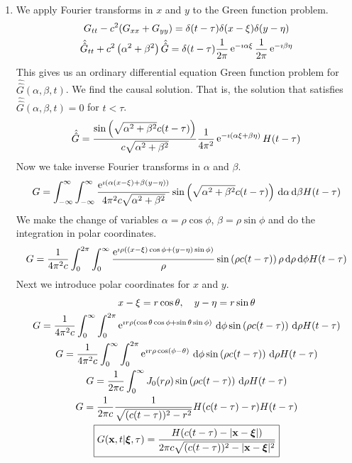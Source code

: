 {\begin{Solution}
  \begin{enumerate}
  \item
    We apply Fourier transforms in $x$ and $y$ to the Green function problem.
    \begin{gather*}
      G_{t t} - c^2 (G_{x x} + G_{y y}) = \delta(t - \tau) \delta(x - \xi) \delta(y - \eta)
      \\
      \hat{\hat{G}}_{t t} + c^2 \left( \alpha^2 + \beta^2 \right) \hat{\hat{G}} 
      = \delta(t - \tau) \frac{1}{2 \pi} \mathop{\mathrm{e}}\nolimits^{-\imath \alpha \xi} \frac{1}{2 \pi} \mathop{\mathrm{e}}\nolimits^{-\imath \beta \eta}
    \end{gather*}
    This gives us an ordinary differential equation Green function problem
    for $\hat{\hat{G}}(\alpha, \beta, t)$.        We find the causal solution.  That is, 
    the solution that satisfies $\hat{\hat{G}}(\alpha, \beta, t) = 0$ for $t < \tau$.
    \[
    \hat{\hat{G}} = \frac{ \sin \left( \sqrt{\alpha^2 + \beta^2} c (t - \tau) \right) }
    { c \sqrt{\alpha^2 + \beta^2} } \frac{1}{4 \pi^2} \mathop{\mathrm{e}}\nolimits^{-\imath (\alpha \xi + \beta \eta)} H(t - \tau)
    \]
    Now we take inverse Fourier transforms in $\alpha$ and $\beta$.
    \[
    G = \int_{-\infty}^\infty \int_{-\infty}^\infty \frac{ \mathop{\mathrm{e}}\nolimits^{\imath (\alpha (x - \xi) + \beta (y - \eta))}        }
    { 4 \pi^2 c \sqrt{\alpha^2 + \beta^2} } \sin \left( \sqrt{\alpha^2 + \beta^2} c (t - \tau) \right) 
    \,\mathrm{d} \alpha \,\mathrm{d} \beta H(t - \tau)
    \]
    We make the change of variables $\alpha = \rho \cos \phi$, $\beta = \rho \sin \phi$ and do the 
    integration in polar coordinates.
    \[
    G = \frac{1}{4 \pi^2 c} \int_0^{2 \pi} \int_0^\infty \frac{ \mathop{\mathrm{e}}\nolimits^{\imath \rho ((x - \xi) \cos \phi + (y - \eta) \sin \phi)}  }
    { \rho } \sin \left( \rho c (t - \tau) \right) \rho \,\mathrm{d} \rho \,\mathrm{d} \phi H(t - \tau)
    \]
    Next we introduce polar coordinates for $x$ and $y$.
    \begin{gather*}
      x - \xi = r \cos \theta, \quad y - \eta = r \sin \theta
      \\
      G = \frac{1}{4 \pi^2 c} \int_0^\infty \int_0^{2 \pi} \mathop{\mathrm{e}}\nolimits^{\imath r \rho (\cos \theta \cos \phi + \sin \theta \sin \phi)} \,\mathrm{d} \phi
      \sin \left( \rho c (t - \tau) \right) \,\mathrm{d} \rho H(t - \tau)
      \\
      G = \frac{1}{4 \pi^2 c} \int_0^\infty \int_0^{2 \pi} \mathop{\mathrm{e}}\nolimits^{\imath r \rho \cos(\phi-\theta)} \,\mathrm{d} \phi
      \sin \left( \rho c (t - \tau) \right) \,\mathrm{d} \rho H(t - \tau)
      \\
      G = \frac{1}{2 \pi c} \int_0^\infty J_0(r \rho) \sin \left( \rho c (t - \tau) \right) \,\mathrm{d} \rho 
      H(t - \tau)
      \\
      G = \frac{1}{2 \pi c} \frac{1}{\sqrt{ (c (t - \tau))^2 - r^2 } } H( c(t - \tau) - r )
      H(t - \tau)
      \\
      \boxed{
        G( \mathbf{x}, t | \boldsymbol{\xi}, \tau ) 
        = \frac{H( c(t - \tau) - | \mathbf{x} - \boldsymbol{\xi}| )}
        {2 \pi c \sqrt{ (c (t - \tau))^2 - | \mathbf{x} - \boldsymbol{\xi}|^2 } } 
        }
    \end{gather*}


\end{enumerate}
\end{Solution}}
